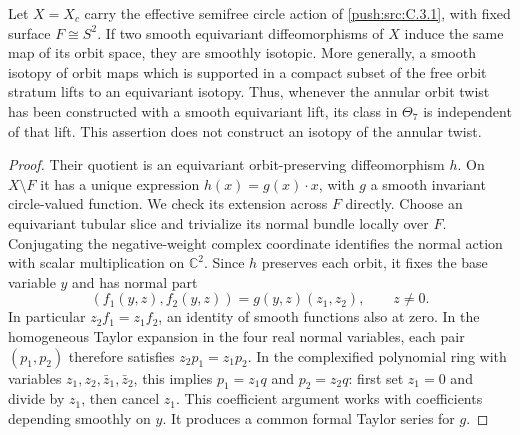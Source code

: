 \begin{proposition}\label{push:src:C.3.6}
Let \(X=X_c\) carry the effective semifree circle action of \ref{push:src:C.3.1},
with fixed surface \(F\cong S^2\). If two smooth equivariant
diffeomorphisms of \(X\) induce the same map of its orbit space,
they are smoothly isotopic. More generally, a smooth isotopy of
orbit maps which is supported in a compact subset of the free
orbit stratum lifts to an equivariant isotopy. Thus, whenever the
annular orbit twist has been constructed with a smooth equivariant
lift, its class in \(\Theta_7\) is independent of that lift.
This assertion does not construct an isotopy of the annular twist.
\end{proposition}
\begin{proof}
Their quotient is an equivariant orbit-preserving diffeomorphism
\(h\). On \(X\setminus F\) it has a unique expression
\(h(x)=g(x)\cdot x\), with \(g\) a smooth invariant circle-valued
function. We check its extension across \(F\) directly. Choose an
equivariant tubular slice and trivialize its normal bundle locally
over \(F\). Conjugating the negative-weight complex coordinate
identifies the normal action with scalar multiplication on
\(\mathbb C^2\). Since \(h\) preserves each orbit, it fixes the
base variable \(y\) and has normal part
\[
 (f_1(y,z),f_2(y,z))=g(y,z)(z_1,z_2),\qquad z\ne0.
\]
In particular \(z_2f_1=z_1f_2\), an identity of smooth functions
also at zero. In the homogeneous Taylor expansion in the four real
normal variables, each pair \((p_1,p_2)\) therefore satisfies
\(z_2p_1=z_1p_2\). In the complexified polynomial ring with
variables \(z_1,z_2,\bar z_1,\bar z_2\), this implies
\(p_1=z_1q\) and \(p_2=z_2q\): first set \(z_1=0\) and divide
by \(z_1\), then cancel \(z_1\). This coefficient argument works
with coefficients depending smoothly on \(y\). It produces a
common formal Taylor series for \(g\).


\end{proof}
